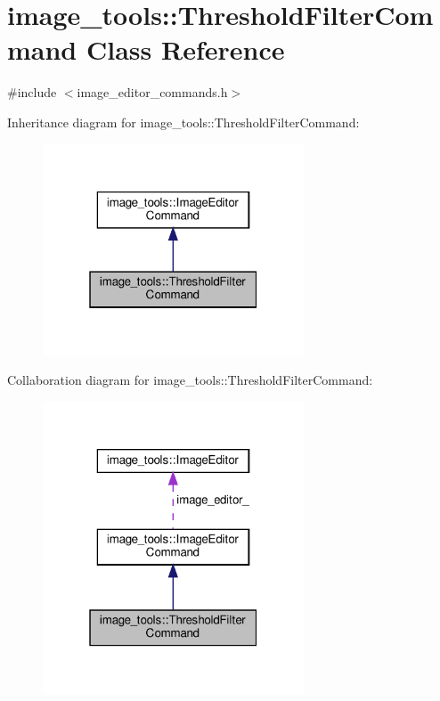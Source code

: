\hypertarget{classimage__tools_1_1ThresholdFilterCommand}{}\section{image\+\_\+tools\+:\+:Threshold\+Filter\+Command Class Reference}
\label{classimage__tools_1_1ThresholdFilterCommand}


{\ttfamily \#include $<$image\+\_\+editor\+\_\+commands.\+h$>$}



Inheritance diagram for image\+\_\+tools\+:\+:Threshold\+Filter\+Command\+:
\nopagebreak
\begin{figure}[H]
\begin{center}
\leavevmode
\includegraphics[width=220pt]{classimage__tools_1_1ThresholdFilterCommand__inherit__graph}
\end{center}
\end{figure}


Collaboration diagram for image\+\_\+tools\+:\+:Threshold\+Filter\+Command\+:
\nopagebreak
\begin{figure}[H]
\begin{center}
\leavevmode
\includegraphics[width=220pt]{classimage__tools_1_1ThresholdFilterCommand__coll__graph}
\end{center}
\end{figure}
